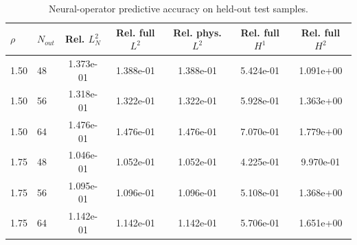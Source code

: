 \begin{table}[h]
\centering
\small
\begin{tabular}{llccccc}
\toprule
$\rho$ & $N_{out}$ & Rel. $L^2_N$ & Rel. full $L^2$ & Rel. phys. $L^2$ & Rel. full $H^{1}$ & Rel. full $H^{2}$ \\
\midrule
1.50 & 48 & 1.373e-01 & 1.388e-01 & 1.388e-01 & 5.424e-01 & 1.091e+00 \\
1.50 & 56 & 1.318e-01 & 1.322e-01 & 1.322e-01 & 5.928e-01 & 1.363e+00 \\
1.50 & 64 & 1.476e-01 & 1.476e-01 & 1.476e-01 & 7.070e-01 & 1.779e+00 \\
1.75 & 48 & 1.046e-01 & 1.052e-01 & 1.052e-01 & 4.225e-01 & 9.970e-01 \\
1.75 & 56 & 1.095e-01 & 1.096e-01 & 1.096e-01 & 5.108e-01 & 1.368e+00 \\
1.75 & 64 & 1.142e-01 & 1.142e-01 & 1.142e-01 & 5.706e-01 & 1.651e+00 \\
\bottomrule
\end{tabular}
\caption{Neural-operator predictive accuracy on held-out test samples.}
\label{tab:operator_accuracy_heat_equation}
\end{table}
